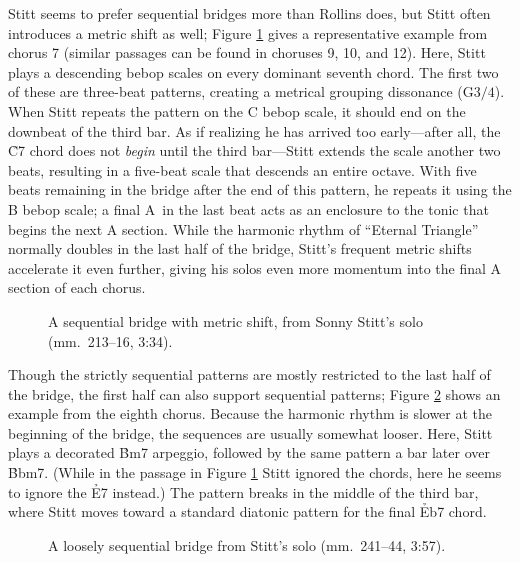 Stitt seems to prefer sequential bridges more than Rollins does, but Stitt
often introduces a metric shift as well; Figure \ref{et:ss-bridge-shift} gives
a representative example from chorus 7 (similar passages can be found in
choruses 9, 10, and 12). Here, Stitt plays a descending bebop scales on every
dominant seventh chord. The first two of these are three-beat patterns,
creating a metrical grouping dissonance (G$3/4$). When Stitt repeats
the pattern on the C bebop scale, it should end on the downbeat of the third
bar. As if realizing he has arrived too early---after all, the \h{C7} chord
does not \emph{begin} until the third bar---Stitt extends the scale another
two beats, resulting in a five-beat scale that descends an entire octave. With
five beats remaining in the bridge after the end of this pattern, he repeats
it using the B bebop scale; a final A\nat\ in the last beat acts as an
enclosure to the tonic \Bflat that begins the next A section. While the
harmonic rhythm of ``Eternal Triangle'' normally doubles in the last half of
the bridge, Stitt's frequent metric shifts accelerate it even further, giving
his solos even more momentum into the final A section of each chorus.

\begin{figure}[tbp]
  \caption[A sequential bridge with metric shift from Sonny Stitt's solo.]{%
    A sequential bridge with metric shift, from Sonny Stitt's solo
    (mm.~213--16, 3:34).}
  \label{et:ss-bridge-shift}
\end{figure}

Though the strictly sequential patterns are mostly restricted to the last half
of the bridge, the first half can also support sequential patterns; Figure
\ref{et:ss-seq-first-half} shows an example from the eighth chorus. Because
the harmonic rhythm is slower at the beginning of the bridge, the sequences
are usually somewhat looser. Here, Stitt plays a decorated \h{Bm7} arpeggio,
followed by the same pattern a bar later over \h{Bbm7}. (While in the passage
in Figure \ref{et:ss-bridge-shift} Stitt ignored the \ii chords, here he seems
to ignore the \h{E7} instead.) The pattern breaks in the middle of the third
bar, where Stitt moves toward a standard diatonic pattern for the final
\h{Eb7} chord.

\begin{figure}[tbp]
  \caption[A loosely sequential bridge from Stitt's solo.]{%
    A loosely sequential bridge from Stitt's solo (mm.~241--44, 3:57).}
  \label{et:ss-seq-first-half}
\end{figure}

